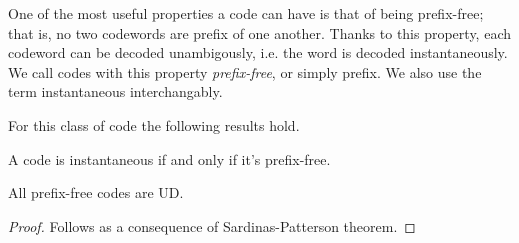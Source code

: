 \documentclass{subfiles}
\begin{document}
    One of the most useful properties a code can have is that of being prefix-free;
        that is, no two codewords are prefix of one another.
        Thanks to this property, each codeword can be decoded unambigously,
        i.e. the word is decoded instantaneously.
        We call codes with this property \emph{prefix-free},
        or simply prefix. We also use the term instantaneous interchangably.

    For this class of code the following results hold.
    \begin{theorem*}
        A code is instantaneous if and only if it's prefix-free.
    \end{theorem*}

    \begin{theorem*}
        All prefix-free codes are UD.
    \end{theorem*}
    \begin{proof}
        Follows as a consequence of Sardinas-Patterson theorem.
    \end{proof}
\end{document}
